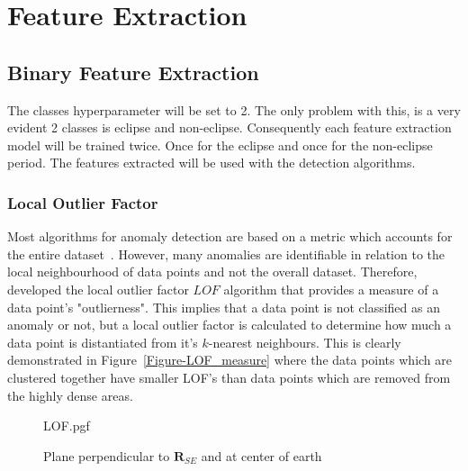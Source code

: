 \chapter{Feature Extraction}
\label{chap:Feature Extraction}


\section{Binary Feature Extraction}
The classes hyperparameter will be set to 2. The only problem with this, is a very evident 2 classes is eclipse and non-eclipse. Consequently each feature extraction model will be trained twice. Once for the eclipse and once for the non-eclipse period. The features extracted will be used with the detection algorithms.

\subsection{Local Outlier Factor}
\label{section:OutlierFactor}
Most algorithms for anomaly detection are based on a metric which accounts for the entire dataset~\cite{breunig2000lof}. However, many anomalies are identifiable in relation to the local neighbourhood of data points and not the overall dataset. Therefore, \cite{breunig2000lof} developed the local outlier factor \(LOF\) algorithm that provides a measure of a data point's "outlierness". This implies that a data point is not classified as an anomaly or not, but a local outlier factor is calculated to determine how much a data point is distantiated from it's $k$-nearest neighbours. This is clearly demonstrated in Figure~\ref{Figure-LOF_measure} where the data points which are clustered together have smaller LOF's than data points which are removed from the highly dense areas.

\begin{figure}[!hbt]
	\centering
	{LOF.pgf}
	\caption{Plane perpendicular to $\mathbf{R}_{SE}$ and at center of earth}
	\label{fig:localOutlierFactor}
\end{figure}


